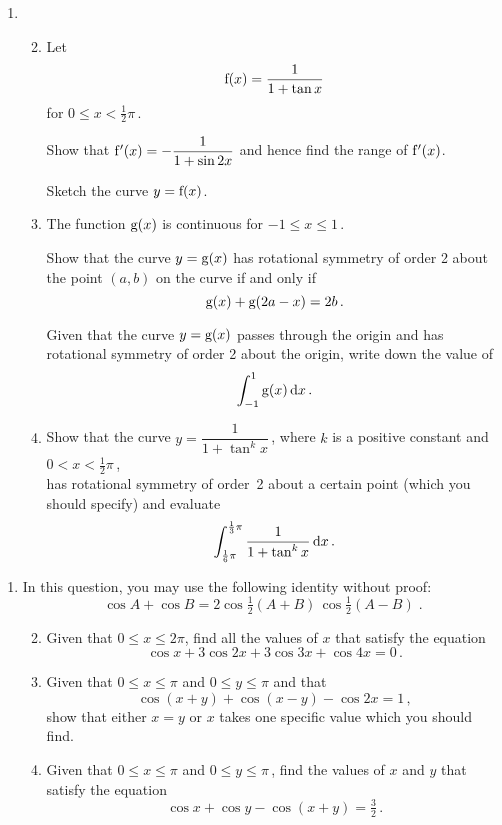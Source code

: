 \documentclass[a4, 11pt]{report}
\newlength{\qspace}
\newcounter{qnumber}
\newenvironment{question}%
 {\vspace{\qspace}
  \begin{enumerate}[\bfseries 1\quad][10]%
    \setcounter{enumi}{\value{qnumber}}%
    \item%
 }
{
  \end{enumerate}
  \filbreak
  \stepcounter{qnumber}
 }
\newenvironment{questionparts}[1][1]%
 {
  \begin{enumerate}[\bfseries (i)]%
    \setcounter{enumii}{#1}
    \addtocounter{enumii}{-1}
    \setlength{\itemsep}{5mm}
    \setlength{\parskip}{5pt}
 }
 {
  \end{enumerate}
 }
\def\d{{\rm d}}
\def\g{{\rm g}}
\def\f{{\rm f}}
\def\le{\leqslant}
\begin{document}
\begin{question}
\begin{questionparts}
\item
Let 
\[
\f(x) 
 = \frac 1 {1+\tan x}
\]
for $0\le x < \frac12\pi\,$.

Show that $\f'(x)= -\dfrac{1}{1+\sin 2x}$ and hence find the 
range of $\f'(x)$. 

Sketch the curve $y=\f(x)$.

\item The function $\g(x)$ is continuous for $-1\le x \le 1\,$. 

Show that the curve $y=\g(x)$ has  rotational
 symmetry of order 2
about
the point $(a,b)$ on the curve if and only if
\[
\g(x) + \g(2a-x) = 2b\,.
\]

Given that the curve $y=\g(x)$ 
passes through the origin and
has rotational
 symmetry of order 2 
about the origin, 
write
down the value of 
\[\displaystyle \int_{-1}^1 \g(x)\,\d x\,.
\]
\item
Show that the curve $y=\dfrac{1}{1+\tan^kx}\,$,
where $k$ is a positive constant and $0<x<\frac12\pi\,$,
\\[3mm]
 has rotational 
symmetry of 
order~2 about a certain point (which you should specify) and evaluate
\[
\int_{\frac16\pi}^{\frac13\pi} \frac 1 {1+\tan^kx} \, \d x 
\,.
\]
\end{questionparts}

\end{question}
\begin{question}
In this question, 
you may use the following identity without proof:
\[
\cos A + \cos B = 2\cos\tfrac12(A+B) \, \cos \tfrac12(A-B)
\;.
\]

\begin{questionparts}

\item
Given that $0\le x \le   2\pi$, find all the values of $x$ that satisfy
the equation
\[
\cos x + 3\cos 2x + 3\cos 3 x + \cos 4x= 0
\,.
\]

\item
Given that
$0\le x \le \pi$ and $0\le y \le \pi$ and that
\[
\cos (x+y) + \cos (x-y) -\cos2x = 1
\,,
\]
show that  either $x=y$ or $x$ takes one specific value which you should find. 
\item
Given that
$0\le x \le \pi$ and $0\le y \le \pi\,$, 
find the values of $x$ and $y$ 
that satisfy the equation
\[
\cos x + \cos y -\cos (x+y) = \tfrac32
\,.
\]
\end{questionparts}
\end{question}
\end{document}
